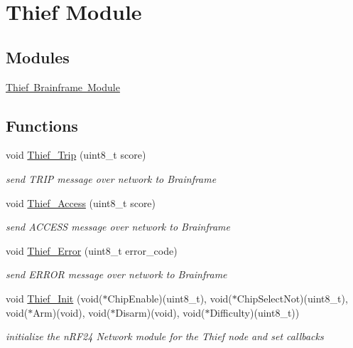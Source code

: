 \hypertarget{group__thief}{}\section{Thief Module}
\label{group__thief}
\subsection*{Modules}
\begin{DoxyCompactItemize}
\item 
\mbox{\hyperlink{group__thief__brainframe}{Thief Brainframe Module}}
\end{DoxyCompactItemize}
\subsection*{Functions}
\begin{DoxyCompactItemize}
\item 
void \mbox{\hyperlink{group__thief_ga03f9659356dd27b2c363ec392788dc50}{Thief\+\_\+\+Trip}} (uint8\+\_\+t score)
\begin{DoxyCompactList}\small\item\em send T\+R\+IP message over network to Brainframe \end{DoxyCompactList}\item 
void \mbox{\hyperlink{group__thief_ga9452fbc6fc191bdc2b07c6f64fcaf4d1}{Thief\+\_\+\+Access}} (uint8\+\_\+t score)
\begin{DoxyCompactList}\small\item\em send A\+C\+C\+E\+SS message over network to Brainframe \end{DoxyCompactList}\item 
void \mbox{\hyperlink{group__thief_gad35f1b0518e285e9b5ea7b7be1a1c6e0}{Thief\+\_\+\+Error}} (uint8\+\_\+t error\+\_\+code)
\begin{DoxyCompactList}\small\item\em send E\+R\+R\+OR message over network to Brainframe \end{DoxyCompactList}\item 
void \mbox{\hyperlink{group__thief_ga46dd5608b4e5e77b04ef07a9a390cb8f}{Thief\+\_\+\+Init}} (void($\ast$Chip\+Enable)(uint8\+\_\+t), void($\ast$Chip\+Select\+Not)(uint8\+\_\+t), void($\ast$Arm)(void), void($\ast$Disarm)(void), void($\ast$Difficulty)(uint8\+\_\+t))
\begin{DoxyCompactList}\small\item\em initialize the n\+R\+F24 Network module for the Thief node and set callbacks \end{DoxyCompactList}\end{DoxyCompactItemize}


